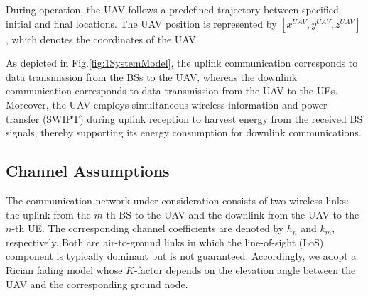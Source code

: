 \documentclass[conference]{IEEEtran}
\begin{document}
During operation, the UAV follows a predefined trajectory between specified initial and final locations. The UAV position is represented by $[x^{UAV}, y^{UAV}, z^{UAV}]$, which denotes the coordinates of the UAV.

As depicted in Fig.\ref{fig:1SystemModel}, the uplink communication corresponds to data transmission from the BSs to the UAV, whereas the downlink communication corresponds to data transmission from the UAV to the UEs. Moreover, the UAV employs simultaneous wireless information and power transfer (SWIPT) during uplink reception to harvest energy from the received BS signals, thereby supporting its energy consumption for downlink communications.

\subsection{Channel Assumptions}
\label{subsec:channel_assumptions}

The communication network under consideration consists of two wireless
links: the uplink from the $m$-th BS to the UAV and the downlink from the
UAV to the $n$-th UE. The corresponding channel coefficients are denoted
by $h_n$ and $k_m$, respectively. Both are air-to-ground links in which
the line-of-sight (LoS) component is typically dominant but is not
guaranteed. Accordingly, we adopt a Rician fading model whose $K$-factor
depends on the elevation angle between the UAV and the corresponding
ground node.
\end{document}
